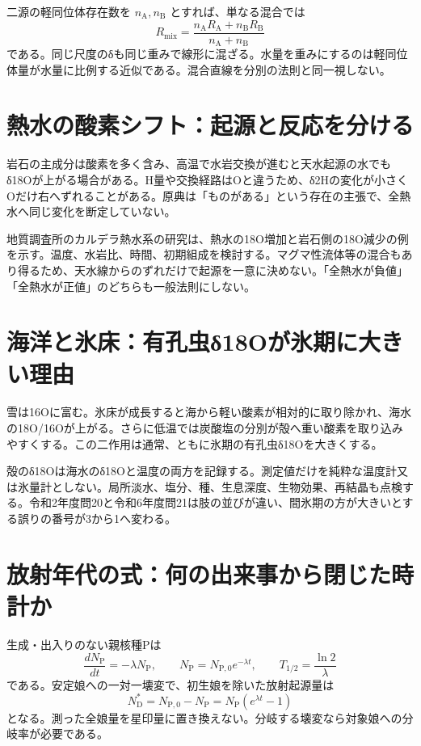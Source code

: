 二源の軽同位体存在数を \(n_{\mathrm A},n_{\mathrm B}\) とすれば、単なる混合では
\[
 R_{\mathrm{mix}}=
 \frac{n_{\mathrm A}R_{\mathrm A}+n_{\mathrm B}R_{\mathrm B}}
 {n_{\mathrm A}+n_{\mathrm B}}
\]
である。同じ尺度のδも同じ重みで線形に混ざる。水量を重みにするのは軽同位体量が水量に比例する近似である。混合直線を分別の法則と同一視しない。

\section{熱水の酸素シフト：起源と反応を分ける}
\label{theory:isotope:hydrothermal}
岩石の主成分は酸素を多く含み、高温で水岩交換が進むと天水起源の水でもδ18Oが上がる場合がある。H量や交換経路はOと違うため、δ2Hの変化が小さくOだけ右へずれることがある。原典は「ものがある」という存在の主張で、全熱水へ同じ変化を断定していない。

地質調査所のカルデラ熱水系の研究は、熱水の18O増加と岩石側の18O減少の例を示す\cite{iso_hydrothermal}。温度、水岩比、時間、初期組成を検討する。マグマ性流体等の混合もあり得るため、天水線からのずれだけで起源を一意に決めない。「全熱水が負値」「全熱水が正値」のどちらも一般法則にしない。

\section{海洋と氷床：有孔虫δ18Oが氷期に大きい理由}
\label{theory:isotope:climate}
雪は16Oに富む。氷床が成長すると海から軽い酸素が相対的に取り除かれ、海水の18O/16Oが上がる。さらに低温では炭酸塩の分別が殻へ重い酸素を取り込みやすくする。この二作用は通常、ともに氷期の有孔虫δ18Oを大きくする\cite{iso_oxygen}。

殻のδ18Oは海水のδ18Oと温度の両方を記録する。測定値だけを純粋な温度計又は氷量計としない。局所淡水、塩分、種、生息深度、生物効果、再結晶も点検する。令和2年度問20と令和6年度問21は肢の並びが違い、間氷期の方が大きいとする誤りの番号が3から1へ変わる。

\section{放射年代の式：何の出来事から閉じた時計か}
\label{theory:isotope:decay}
生成・出入りのない親核種Pは
\[
 \frac{dN_{\mathrm P}}{dt}=-\lambda N_{\mathrm P},\qquad
 N_{\mathrm P}=N_{\mathrm P,0}e^{-\lambda t},\qquad
 T_{1/2}=\frac{\ln2}{\lambda}
\]
である。安定娘への一対一壊変で、初生娘を除いた放射起源量は
\[
 N_{\mathrm D}^{*}=N_{\mathrm P,0}-N_{\mathrm P}
 =N_{\mathrm P}(e^{\lambda t}-1)
\]
となる。測った全娘量を星印量に置き換えない。分岐する壊変なら対象娘への分岐率が必要である\cite{iso_radiometric}。

